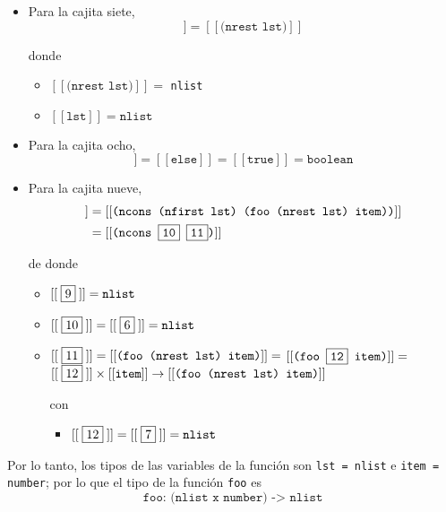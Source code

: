 \documentclass[letterpaper,11pt]{article}
\begin{document}
\begin{enumerate}
\begin{itemize}
        \item Para la cajita siete, 
        \begin{equation*}
            [[\;\fbox{7}\;]] = [[\texttt{(nrest lst)}]]
        \end{equation*}

        donde 
        \begin{itemize}
            \item $[[\texttt{(nrest lst)}]] =$ \texttt{nlist}
            \item $[[\texttt{lst}]] = \texttt{nlist}$
        \end{itemize}

        \item Para la cajita ocho,
        \begin{equation*}
            [[8]] = [[\texttt{else}]] = [[\texttt{true}]] = \texttt{boolean}
        \end{equation*}

        \item Para la cajita nueve,
        \begin{align*}
            [[\;\fbox{9}\;]]
            &= [[\texttt{(ncons (nfirst lst) (foo (nrest lst) item))}]] \\ 
            &= [[\texttt{(ncons \fbox{10} \fbox{11})}]] 
        \end{align*}

        de donde 
        \begin{itemize}
            \item $[[\;\fbox{9}\;]] = \texttt{nlist}$
            \item $[[\;\fbox{10}\;]] = [[\;\fbox{6}\;]] = \texttt{nlist}$
            \item $[[\;\fbox{11} \;]] = [[\texttt{(foo (nrest lst) item)}]] = $
            $[[\texttt{(foo \fbox{12} item)}]] =$ \\ 
            $[[\;\fbox{12}\;]] \times [[\texttt{item}]] \rightarrow 
            [[\texttt{(foo (nrest lst) item)}]]$

            con 
            \begin{itemize}
                \item $[[\;\fbox{12}\;]] = [[\;\fbox{7}\;]] = \texttt{nlist}$
            \end{itemize}
        \end{itemize}
    \end{itemize}

    Por lo tanto, los tipos de las variables de la función son \texttt{lst = nlist}
    e \texttt{item = number}; por lo que el tipo de la función \texttt{foo} es 
    \begin{equation*}
        \texttt{foo: (nlist x number) -> nlist}
    \end{equation*}


\end{enumerate}
\end{document}
